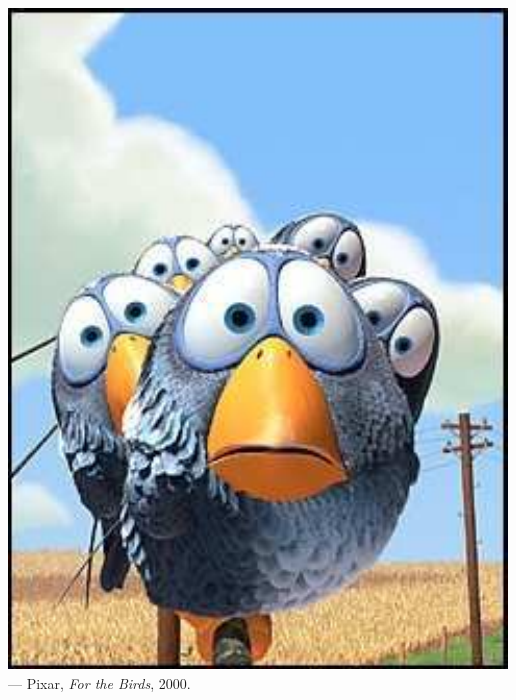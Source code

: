 \begin{centering}
{\begin{minipage}{\wd0}
 \includegraphics{pixar[forTheBirds]}\\%
 \null \hfill  --- Pixar, \emph{For the Birds}, 2000.
 \end{minipage}
 \par}

\end{centering}

\vfill
\cleardoublepage
